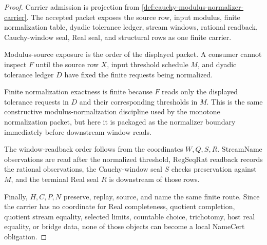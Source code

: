 \begin{proof}
Carrier admission is projection from \autoref{def:cauchy-modulus-normalizer-carrier}. The accepted packet exposes the source row, input modulus, finite normalization table, dyadic tolerance ledger, stream windows, rational readback, Cauchy-window seal, Real seal, and structural rows as one finite carrier.

Modulus-source exposure is the order of the displayed packet. A consumer cannot inspect $F$ until the source row $X$, input threshold schedule $M$, and dyadic tolerance ledger $D$ have fixed the finite requests being normalized.

Finite normalization exactness is finite because $F$ reads only the displayed tolerance requests in $D$ and their corresponding thresholds in $M$. This is the same constructive modulus-normalization discipline used by the monotone normalization packet, but here it is packaged as the normalizer boundary immediately before downstream window reads.

The window-readback order follows from the coordinates $W,Q,S,R$. StreamName observations are read after the normalized threshold, RegSeqRat readback records the rational observations, the Cauchy-window seal $S$ checks preservation against $M$, and the terminal Real seal $R$ is downstream of those rows.

Finally, $H,C,P,N$ preserve, replay, source, and name the same finite route. Since the carrier has no coordinate for Real completeness, quotient completion, quotient stream equality, selected limits, countable choice, trichotomy, host real equality, or bridge data, none of those objects can become a local NameCert obligation.
\end{proof}



